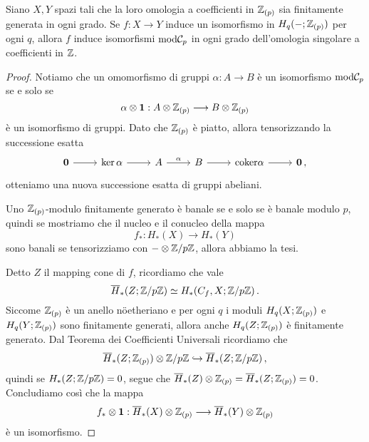 \begin{lemma}
	Siano $X,Y$ spazi tali che la loro omologia a coefficienti in ${\mathbb Z}_{(p)}$
	sia finitamente generata in ogni grado.
	Se $f : X \to Y$ induce un isomorfismo in $H_{q}(-;{\mathbb Z}_{(p)})$ per ogni $q$,
	allora $f$ induce isomorfismi $\mathrm{mod}\mathcal{C}_{p}$ 
	in ogni grado dell'omologia singolare
	a coefficienti in ${\mathbb Z}$.
	\begin{proof}
		Notiamo che un omomorfismo di gruppi $\alpha : A \to B$
		è un isomorfismo $\mathrm{mod}\mathcal{C}_{p}$ se e solo se
		\begin{equation*}
			\alpha \otimes {\normalfont\textbf{1}} : A \otimes {\mathbb Z}_{(p)} \longrightarrow B \otimes {\mathbb Z}_{(p)}
		\end{equation*}
		è un isomorfismo di gruppi.
		Dato che ${\mathbb Z}_{(p)}$ è piatto, allora tensorizzando
		la successione esatta
		\begin{equation*}
			\begin{tikzcd}
				\cat{0} \ar[r]
				& \ker \alpha \ar[r]
				& A \ar[r, "\alpha"]
				& B \ar[r]
				& \mathrm{coker}\alpha \ar[r]
				& \cat{0}\,,
			\end{tikzcd}
		\end{equation*}
		otteniamo una nuova successione esatta di gruppi abeliani.
		
		Uno ${\mathbb Z}_{(p)}$-modulo finitamente generato è banale
		se e solo se è banale modulo $p$, quindi
		se mostriamo che il nucleo e il conucleo della mappa
		\begin{equation*}
			f_{*}:H_{*}(X) \longrightarrow H_{*}(Y)
		\end{equation*}
		sono banali se tensorizziamo con $- \otimes {\mathbb Z}/p{\mathbb Z}$, allora
		abbiamo la tesi.
		
		Detto $Z$ il mapping cone di $f$, ricordiamo che vale
		\begin{equation*}
			\overline{H}_{*}(Z; {\mathbb Z}/p{\mathbb Z}) \simeq H_{*}(C_{f},X; {\mathbb Z}/p{\mathbb Z})\,.
		\end{equation*}
		Siccome ${\mathbb Z}_{(p)}$ è un anello nöetheriano
		e per ogni $q$ i moduli
		$H_{q}(X;{\mathbb Z}_{(p)})$ e $H_{q}(Y;{\mathbb Z}_{(p)})$ sono finitamente generati,
		allora anche $H_{q}(Z;{\mathbb Z}_{(p)})$ è finitamente generato.
		Dal Teorema dei Coefficienti Universali
		ricordiamo che
		\begin{equation*}
			\overline{H}_{*}(Z;{\mathbb Z}_{(p)}) \otimes {\mathbb Z}/p{\mathbb Z} \hookrightarrow
			\overline{H}_{*}(Z; {\mathbb Z}/p{\mathbb Z})\,,
		\end{equation*}
		quindi se $H_{*}(Z; {\mathbb Z}/p{\mathbb Z}) = 0$,
		segue che $\overline{H}_{*}(Z) \otimes {\mathbb Z}_{(p)} = \overline{H}_{*}(Z;{\mathbb Z}_{(p)})=0$.
		Concludiamo così che la mappa
		\begin{equation*}
			f_{*} \otimes {\normalfont\textbf{1}} : \overline{H}_{*}(X) \otimes {\mathbb Z}_{(p)}
			\longrightarrow \overline{H}_{*}(Y) \otimes {\mathbb Z}_{(p)}
		\end{equation*}
		è un isomorfismo.
	\end{proof}
\end{lemma}

